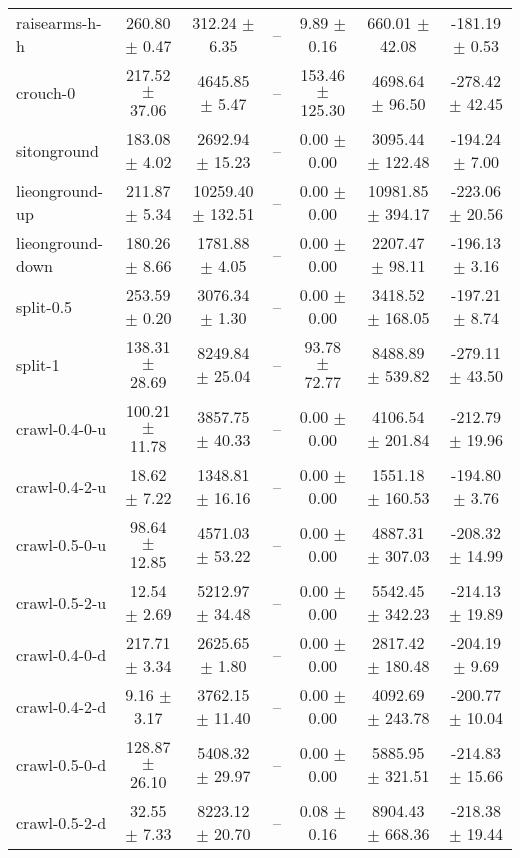 \begin{tabular}{|lcccccc|}
raisearms-h-h & 260.80 $\pm$ 0.47 & 312.24 $\pm$ 6.35 & -- & 9.89 $\pm$ 0.16 & 660.01 $\pm$ 42.08 & -181.19 $\pm$ 0.53 \\
crouch-0 & 217.52 $\pm$ 37.06 & 4645.85 $\pm$ 5.47 & -- & 153.46 $\pm$ 125.30 & 4698.64 $\pm$ 96.50 & -278.42 $\pm$ 42.45 \\
sitonground & 183.08 $\pm$ 4.02 & 2692.94 $\pm$ 15.23 & -- & 0.00 $\pm$ 0.00 & 3095.44 $\pm$ 122.48 & -194.24 $\pm$ 7.00 \\
lieonground-up & 211.87 $\pm$ 5.34 & 10259.40 $\pm$ 132.51 & -- & 0.00 $\pm$ 0.00 & 10981.85 $\pm$ 394.17 & -223.06 $\pm$ 20.56 \\
lieonground-down & 180.26 $\pm$ 8.66 & 1781.88 $\pm$ 4.05 & -- & 0.00 $\pm$ 0.00 & 2207.47 $\pm$ 98.11 & -196.13 $\pm$ 3.16 \\
split-0.5 & 253.59 $\pm$ 0.20 & 3076.34 $\pm$ 1.30 & -- & 0.00 $\pm$ 0.00 & 3418.52 $\pm$ 168.05 & -197.21 $\pm$ 8.74 \\
split-1 & 138.31 $\pm$ 28.69 & 8249.84 $\pm$ 25.04 & -- & 93.78 $\pm$ 72.77 & 8488.89 $\pm$ 539.82 & -279.11 $\pm$ 43.50 \\
crawl-0.4-0-u & 100.21 $\pm$ 11.78 & 3857.75 $\pm$ 40.33 & -- & 0.00 $\pm$ 0.00 & 4106.54 $\pm$ 201.84 & -212.79 $\pm$ 19.96 \\
crawl-0.4-2-u & 18.62 $\pm$ 7.22 & 1348.81 $\pm$ 16.16 & -- & 0.00 $\pm$ 0.00 & 1551.18 $\pm$ 160.53 & -194.80 $\pm$ 3.76 \\
crawl-0.5-0-u & 98.64 $\pm$ 12.85 & 4571.03 $\pm$ 53.22 & -- & 0.00 $\pm$ 0.00 & 4887.31 $\pm$ 307.03 & -208.32 $\pm$ 14.99 \\
crawl-0.5-2-u & 12.54 $\pm$ 2.69 & 5212.97 $\pm$ 34.48 & -- & 0.00 $\pm$ 0.00 & 5542.45 $\pm$ 342.23 & -214.13 $\pm$ 19.89 \\
crawl-0.4-0-d & 217.71 $\pm$ 3.34 & 2625.65 $\pm$ 1.80 & -- & 0.00 $\pm$ 0.00 & 2817.42 $\pm$ 180.48 & -204.19 $\pm$ 9.69 \\
crawl-0.4-2-d & 9.16 $\pm$ 3.17 & 3762.15 $\pm$ 11.40 & -- & 0.00 $\pm$ 0.00 & 4092.69 $\pm$ 243.78 & -200.77 $\pm$ 10.04 \\
crawl-0.5-0-d & 128.87 $\pm$ 26.10 & 5408.32 $\pm$ 29.97 & -- & 0.00 $\pm$ 0.00 & 5885.95 $\pm$ 321.51 & -214.83 $\pm$ 15.66 \\
crawl-0.5-2-d & 32.55 $\pm$ 7.33 & 8223.12 $\pm$ 20.70 & -- & 0.08 $\pm$ 0.16 & 8904.43 $\pm$ 668.36 & -218.38 $\pm$ 19.44 \\
\hline
\end{tabular}

